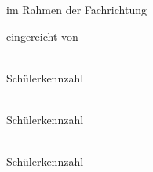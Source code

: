 
\newlength{\tmpbaselineskip}
\setlength{\tmpbaselineskip}{\baselineskip}
\setlength{\baselineskip}{13.6pt}
\newlength{\tmpparindent}
\setlength{\tmpparindent}{\parindent}
\setlength{\parindent}{17pt}

\thispagestyle{tuinftitlepage}

\begin{center}
\begin{minipage}[t][4.0cm][b]{\linewidth}%
    \centering%
    \thesistitlefontLARGE\sffamily\bfseries\tuinfthesistitle%
\end{minipage}

\vspace{0.9cm}

{\thesistitlefontLARGE\sffamily \tuinfthesistype}

\vspace{5mm}

{\thesistitlefontlarge\sffamily im Rahmen der Fachrichtung}

\vspace{4mm}

{\thesistitlefontLarge\sffamily\bfseries \tuinfthesiscurriculum}

\vspace{6mm}

{\thesistitlefontlarge\sffamily eingereicht von}

\vspace{5mm}

{\thesistitlefontLarge\sffamily\bfseries \tuinfthesisauthoreins} \\
\vspace{1mm}
{\thesistitlefontlarge\sffamily Schülerkennzahl \tuinfthesismatrikelnoeins}

\vspace{4mm}

{\thesistitlefontLarge\sffamily\bfseries \tuinfthesisauthorzwei} \\
\vspace{1mm}
{\thesistitlefontlarge\sffamily Schülerkennzahl \tuinfthesismatrikelnozwei}

\vspace{4mm}

{\thesistitlefontLarge\sffamily\bfseries \tuinfthesisauthordrei} \\
\vspace{1mm}
{\thesistitlefontlarge\sffamily Schülerkennzahl \tuinfthesismatrikelnodrei}


\end{center}
